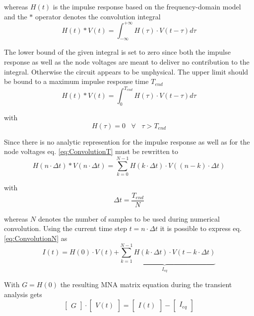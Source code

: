 whereas $H\left(t\right)$ is the impulse response based on the
frequency-domain model and the $*$ operator denotes the convolution
integral
\begin{equation}
H\left(t\right)
*
V\left(t\right)
=
\int^{+\infty}_{-\infty} H\left(\tau\right)\cdot V\left(t-\tau\right) d\tau
\end{equation}

The lower bound of the given integral is set to zero since both the
impulse response as well as the node voltages are meant to deliver no
contribution to the integral.  Otherwise the circuit appears to be
unphysical.  The upper limit should be bound to a maximum impulse
response time $T_{end}$
\begin{equation}
\label{eq:ConvolutionT}
H\left(t\right)
*
V\left(t\right)
=
\int^{T_{end}}_{0} H\left(\tau\right)\cdot V\left(t-\tau\right) d\tau
\end{equation}

with
\begin{equation}
H\left(\tau\right) = 0 \;\;\; \forall \;\;\; \tau > T_{end}
\end{equation}

Since there is no analytic represention for the impulse response as
well as for the node voltages eq. \eqref{eq:ConvolutionT} must be
rewritten to
\begin{equation}
\label{eq:ConvolutionN}
H\left(n\cdot\Delta t\right)
*
V\left(n\cdot\Delta t\right)
=
\sum^{N-1}_{k=0} H\left(k\cdot\Delta t\right)\cdot V\left(\left(n-k\right)\cdot\Delta t\right)
\end{equation}

with
\begin{equation}
\Delta t = \dfrac{T_{end}}{N}
\end{equation}

whereas $N$ denotes the number of samples to be used during numerical
convolution.  Using the current time step $t = n\cdot\Delta t$ it is
possible to express eq. \eqref{eq:ConvolutionN} as
\begin{equation}
I\left(t\right) =
H\left(0\right)\cdot V\left(t\right) \underbrace{+
\sum^{N-1}_{k=1} H\left(k\cdot\Delta t\right)\cdot V\left(t -k\cdot\Delta t\right)}_{I_{eq}}
\end{equation}

With $G = H\left(0\right)$ the resulting MNA matrix equation during
the transient analysis gets
\begin{equation}
\begin{bmatrix}
G
\end{bmatrix}
\cdot
\begin{bmatrix}
V\left(t\right)
\end{bmatrix}
=
\begin{bmatrix}
I\left(t\right)
\end{bmatrix}
-
\begin{bmatrix}
I_{eq}
\end{bmatrix}
\end{equation}

